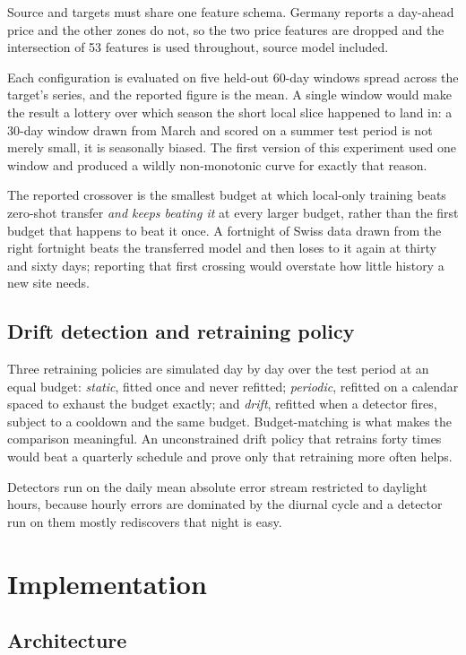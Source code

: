\documentclass[11pt,a4paper,oneside]{report}
\begin{document}
Source and targets must share one feature schema. Germany reports a day-ahead price and the other zones do not, so the two price features are dropped and the intersection of 53 features is used throughout, source model included.

Each configuration is evaluated on five held-out 60-day windows spread across the target's series, and the reported figure is the mean. A single window would make the result a lottery over which season the short local slice happened to land in: a 30-day window drawn from March and scored on a summer test period is not merely small, it is seasonally biased. The first version of this experiment used one window and produced a wildly non-monotonic curve for exactly that reason.

The reported crossover is the smallest budget at which local-only training beats zero-shot transfer \emph{and keeps beating it} at every larger budget, rather than the first budget that happens to beat it once. A fortnight of Swiss data drawn from the right fortnight beats the transferred model and then loses to it again at thirty and sixty days; reporting that first crossing would overstate how little history a new site needs.

\section{Drift detection and retraining policy}

Three retraining policies are simulated day by day over the test period at an equal budget: \emph{static}, fitted once and never refitted; \emph{periodic}, refitted on a calendar spaced to exhaust the budget exactly; and \emph{drift}, refitted when a detector fires, subject to a cooldown and the same budget. Budget-matching is what makes the comparison meaningful. An unconstrained drift policy that retrains forty times would beat a quarterly schedule and prove only that retraining more often helps.

Detectors run on the daily mean absolute error stream restricted to daylight hours, because hourly errors are dominated by the diurnal cycle and a detector run on them mostly rediscovers that night is easy.


\chapter{Implementation}

\section{Architecture}
\end{document}

